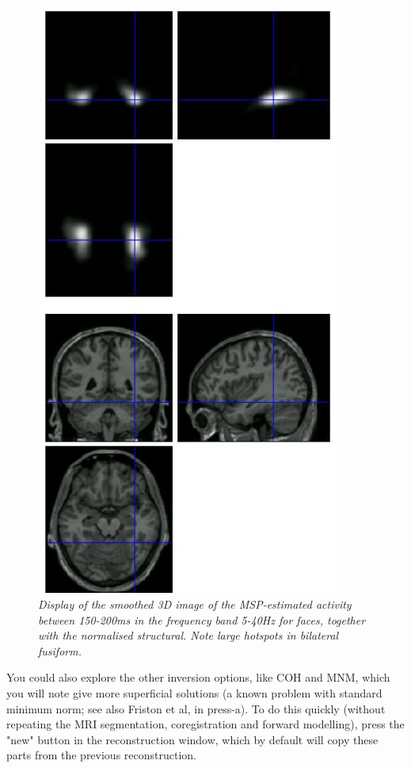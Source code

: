 \begin{figure}
\begin{center}
\includegraphics[width=100mm]{multimodal/figures/figure_32_19}
\caption{\em  Display of the smoothed 3D image of the MSP-estimated activity between 150-200ms in the frequency band 5-40Hz for faces, together with the normalised structural. Note large hotspots in bilateral fusiform.\label{fig_32_19}}
\end{center}
\end{figure}

You could also explore the other inversion options, like COH and MNM, which you will note give more superficial solutions (a known problem with standard minimum norm; see also Friston et al, in press-a). To do this quickly (without repeating the MRI segmentation, coregistration and forward modelling), press the "new" button in the reconstruction window, which by default will copy these parts from the previous reconstruction.


